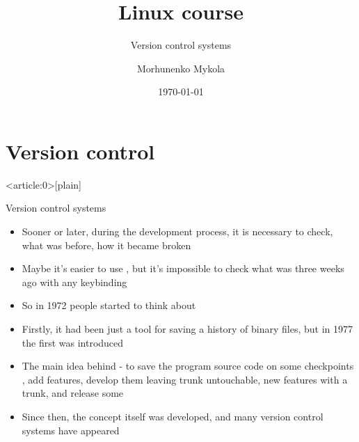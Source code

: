 \documentclass[usenames,dvipsnames,10pt,aspectratio=169]{beamer}
\title{Linux course}
\subtitle{Version control systems}
\date[\today]{\small\today}
\author[Morhunenko Mykola]{Morhunenko Mykola}
\institute{APPS@UCU}
\begin{document}
\begin{frame}
\titlepage
\end{frame}

\begin{frame}{\contentsname}
    \tableofcontents
\end{frame}

\section{Version control}
{ %
    \begin{frame}<article:0>[plain]
     \end{frame}
}

\begin{frame}{Version control systems}    
    \begin{itemize}
        \item Sooner or later, during the development process, it is necessary to check, 
        what was before, how it became broken
        \item Maybe it's easier to use , but it's impossible to check what was three weeks 
        ago with any keybinding
        \item So in 1972 people started to think about 
        \item Firstly, it had been just a tool for saving a history of binary files, but in 1977 
        the first  was introduced
        \item The main idea behind - to save the program source code on some checkpoints
        , add features, develop them leaving trunk untouchable,  new features with a trunk, and release some 
        \item Since then, the concept itself was developed, and many version control systems have appeared
    \end{itemize}
\end{frame}
\end{document}
